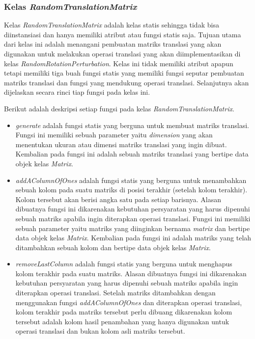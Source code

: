 \subsubsection{Kelas \textit{RandomTranslationMatrix}}
\label{subsubsec:kelas-rtm}

Kelas \textit{RandomTranslationMatrix} adalah kelas statis sehingga tidak bisa diinstansiasi dan hanya memiliki atribut atau fungsi statis saja. Tujuan utama dari kelas ini adalah menangani pembuatan matriks translasi yang akan digunakan untuk melakukan operasi translasi yang akan diimplementasikan di kelas \textit{RandomRotationPerturbation}. Kelas ini tidak memiliki atribut apapun tetapi memiliki tiga buah fungsi statis yang memiliki fungsi seputar pembuatan matriks translasi dan fungsi yang mendukung operasi translasi. Selanjutnya akan dijelaskan secara rinci tiap fungsi pada kelas ini.

Berikut adalah deskripsi setiap fungsi pada kelas \textit{RandomTranslationMatrix}.
\begin{itemize}
	\item \textit{generate} adalah fungsi statis yang berguna untuk membuat matriks translasi. Fungsi ini memiliki sebuah parameter yaitu \textit{dimension} yang akan menentukan ukuran atau dimensi matriks translasi yang ingin dibuat. Kembalian pada fungsi ini adalah sebuah matriks translasi yang bertipe data objek kelas \textit{Matrix}.
	\item \textit{addAColumnOfOnes} adalah fungsi statis yang berguna untuk menambahkan sebuah kolom pada suatu matriks di posisi terakhir (setelah kolom terakhir). Kolom tersebut akan berisi angka satu pada setiap barisnya. Alasan dibuatnya fungsi ini dikarenakan kebutuhan persyaratan yang harus dipenuhi sebuah matriks apabila ingin diterapkan operasi translasi. Fungsi ini memiliki sebuah parameter yaitu matriks yang diinginkan bernama \textit{matrix} dan bertipe data objek kelas \textit{Matrix}. Kembalian pada fungsi ini adalah matriks yang telah ditambahkan sebuah kolom dan bertipe data objek kelas \textit{Matrix}.
	\item \textit{removeLastColumn} adalah fungsi statis yang berguna untuk menghapus kolom terakhir pada suatu matriks. Alasan dibuatnya fungsi ini dikarenakan kebutuhan persyaratan yang harus dipenuhi sebuah matriks apabila ingin diterapkan operasi translasi. Setelah matriks ditambahkan dengan menggunakan fungsi \textit{addAColumnOfOnes} dan diterapkan operasi translasi, kolom terakhir pada matriks tersebut perlu dibuang dikarenakan kolom tersebut adalah kolom hasil penambahan yang hanya digunakan untuk operasi translasi dan bukan kolom asli matriks tersebut.
\end{itemize}

